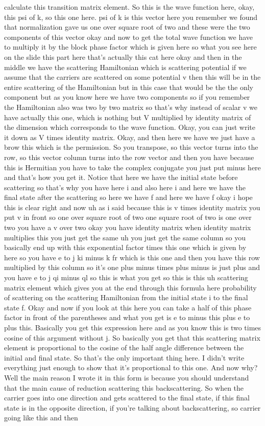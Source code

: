 calculate this transition matrix element. So this is the wave function here, okay, this psi of k, so this one here. psi of k is this vector here you remember we found that normalization gave us one over square root of two and these were the two components of this vector okay and now to get the total wave function we have to multiply it by the block phase factor which is given here so what you see here on the slide this part here that's actually this cat here okay and then in the middle we have the scattering Hamiltonian which is scattering potential if we assume that the carriers are scattered on some potential v then this will be in the entire scattering of the Hamiltonian but in this case that would be the the only component but as you know here we have two components so if you remember the Hamiltonian also was two by two matrix so that's why instead of scalar v we have actually this one, which is nothing but V multiplied by identity matrix of the dimension which corresponds to the wave function. Okay, you can just write it down as V times identity matrix. Okay, and then here we have we just have a brow this which is the permission. So you transpose, so this vector turns into the row, so this vector column turns into the row vector and then you have because this is Hermitian you have to take the complex conjugate you just put minus here and that's how you get it. Notice that here we have the initial state before scattering so that's why you have here i and also here i and here we have the final state after the scattering so here we have f and here we have f okay i hope this is clear right and now uh as i said because this is v times identity matrix you put v in front so one over square root of two one square root of two is one over two you have a v over two okay you have identity matrix when identity matrix multiplies this you just get the same uh you just get the same column so you basically end up with this exponential factor times this one which is given by here so you have e to j ki minus k fr which is this one and then you have this row multiplied by this column so it's one plus minus times plus minus is just plus and you have e to j qi minus ql so this is what you get so this is this uh scattering matrix element which gives you at the end through this formula here probability of scattering on the scattering Hamiltonian from the initial state i to the final state f. Okay and now if you look at this here you can take a half of this phase factor in front of the parentheses and what you get is e to minus this plus e to plus this. Basically you get this expression here and as you know this is two times cosine of this argument without j. So basically you get that this scattering matrix element is proportional to the cosine of the half angle difference between the initial and final state. So that's the only important thing here. I didn't write everything just enough to show that it's proportional to this one. And now why? Well the main reason I wrote it in this form is because you should understand that the main cause of reduction scattering this backscattering. So when the carrier goes into one direction and gets scattered to the final state, if this final state is in the opposite direction, if you're talking about backscattering, so carrier going like this and then 